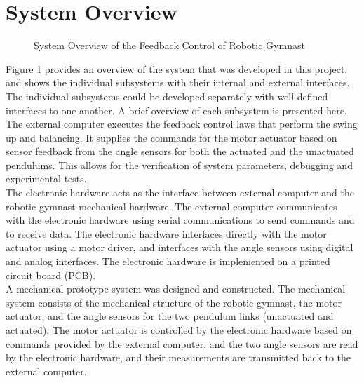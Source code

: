 \section{System Overview}
\label{sec:system_overview}
\begin{figure}[h]
	\centering
	
	\caption{System Overview of the Feedback Control of Robotic Gymnast}
	\label{fig:system_overview}
\end{figure}


Figure \ref{fig:system_overview}  provides an overview of the system that was developed in this project, and shows the individual subsystems with their internal and external interfaces. The individual subsystems could be developed separately with well-defined interfaces to one another. A brief overview of each subsystem is presented here.\\

The external computer executes the feedback control laws that perform the swing up and balancing. It supplies the commands for the motor actuator based on sensor feedback from the angle sensors for both the actuated and the unactuated pendulums. This allows for the verification of system parameters, debugging and experimental tests.\\

The electronic hardware acts as the interface between external computer and the robotic gymnast mechanical hardware. The external computer communicates with the electronic hardware using serial communications to send commands and to receive data. The electronic hardware interfaces directly with the motor actuator using a motor driver, and interfaces with the angle sensors using digital and analog interfaces. The electronic hardware is implemented on a printed circuit board (PCB).\\

A mechanical prototype system was designed and constructed. The mechanical system consists of the mechanical structure of the robotic gymnast, the motor actuator, and the angle sensors for the two pendulum links (unactuated and actuated). The motor actuator is controlled by the electronic hardware based on commands provided by the external computer, and the two angle sensors are read by the electronic hardware, and their measurements are transmitted back to the external computer.\\

